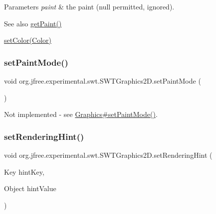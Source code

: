 \begin{DoxyParams}{Parameters}
{\em paint} & the paint ({\ttfamily null} permitted, ignored).\\
\hline
\end{DoxyParams}
\begin{DoxySeeAlso}{See also}
\mbox{\hyperlink{classorg_1_1jfree_1_1experimental_1_1swt_1_1_s_w_t_graphics2_d_a89618656bba11128fda80e24a4b944a8}{get\+Paint()}} 

\mbox{\hyperlink{classorg_1_1jfree_1_1experimental_1_1swt_1_1_s_w_t_graphics2_d_aac2f5469f458244f52ea8dc733faa7ec}{set\+Color(\+Color)}} 
\end{DoxySeeAlso}
\mbox{\label{classorg_1_1jfree_1_1experimental_1_1swt_1_1_s_w_t_graphics2_d_accc022590c0435ceff25222f21d20e2b}} 
\subsubsection{\texorpdfstring{set\+Paint\+Mode()}{setPaintMode()}}
{\footnotesize\ttfamily void org.\+jfree.\+experimental.\+swt.\+S\+W\+T\+Graphics2\+D.\+set\+Paint\+Mode (\begin{DoxyParamCaption}{ }\end{DoxyParamCaption})}

Not implemented -\/ see \mbox{\hyperlink{}{Graphics\#set\+Paint\+Mode()}}. \mbox{\label{classorg_1_1jfree_1_1experimental_1_1swt_1_1_s_w_t_graphics2_d_a9f2008ec82fdd536a5e68de42a31992a}} 
\subsubsection{\texorpdfstring{set\+Rendering\+Hint()}{setRenderingHint()}}
{\footnotesize\ttfamily void org.\+jfree.\+experimental.\+swt.\+S\+W\+T\+Graphics2\+D.\+set\+Rendering\+Hint (\begin{DoxyParamCaption}\item[{Key}]{hint\+Key,  }\item[{Object}]{hint\+Value }\end{DoxyParamCaption})}

